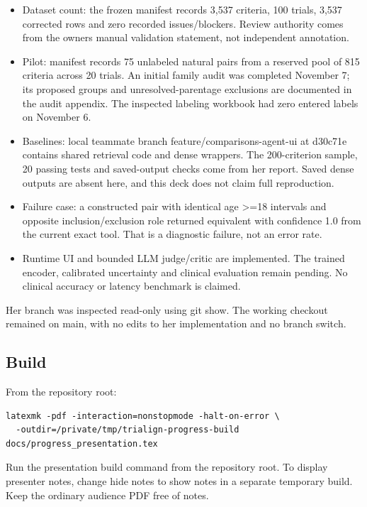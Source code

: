 \documentclass[10pt,letterpaper]{article}
\begin{document}
\begin{itemize}
\item
  Dataset count: the frozen manifest records 3,537 criteria, 100 trials, 3,537 corrected rows and zero recorded issues/blockers. Review authority comes from the owner\textquotesingle s manual validation statement, not independent annotation.
\item
  Pilot: manifest records 75 unlabeled natural pairs from a reserved pool of 815 criteria across 20 trials. An initial family audit was completed November 7; its proposed groups and unresolved-parentage exclusions are documented in the audit appendix. The inspected labeling workbook had zero entered labels on November 6.
\item
  Baselines: local teammate branch feature/comparisons-agent-ui at d30c71e contains shared retrieval code and dense wrappers. The 200-criterion sample, 20 passing tests and saved-output checks come from her report. Saved dense outputs are absent here, and this deck does not claim full reproduction.
\item
  Failure case: a constructed pair with identical age \textgreater=18 intervals and opposite inclusion/exclusion role returned equivalent with confidence 1.0 from the current exact tool. That is a diagnostic failure, not an error rate.
\item
  Runtime UI and bounded LLM judge/critic are implemented. The trained encoder, calibrated uncertainty and clinical evaluation remain pending. No clinical accuracy or latency benchmark is claimed.
\end{itemize}

Her branch was inspected read-only using git show. The working checkout remained on main, with no edits to her implementation and no branch switch.

\subsection{Build}\label{demo-build}

From the repository root:

\begin{Verbatim}[breaklines=true,fontsize=\small]
latexmk -pdf -interaction=nonstopmode -halt-on-error \
  -outdir=/private/tmp/trialign-progress-build docs/progress_presentation.tex
\end{Verbatim}

Run the presentation build command from the repository root. To display presenter notes, change hide notes to show notes in a separate temporary build. Keep the ordinary audience PDF free of notes.
\end{document}
